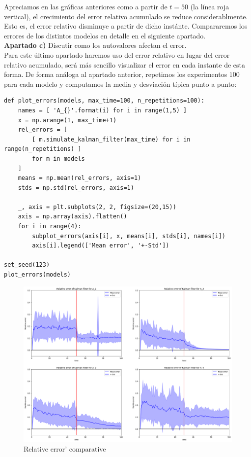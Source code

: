 \documentclass[a4paper]{article}
\begin{document}
Apreciamos en las gráficas anteriores como a partir de $t=50$ (la línea roja vertical), el crecimiento del error relativo acumulado se reduce considerablmente. Esto es, el error relativo disminuye a partir de dicho instánte. Compararemos los errores de los distintos modelos en detalle en el siguiente apartado. \\

\textbf{Apartado c)} Discutir como los autovalores afectan el error. \\

Para este último apartado haremos uso del error relativo en lugar del error relativo acumulado, será más sencillo visualizar el error en cada instante de esta forma. De forma análoga al apartado anterior, repetimos los experimentos $100$ para cada modelo y computamos la media y desviación típica punto a punto:

\begin{verbatim}
def plot_errors(models, max_time=100, n_repetitions=100):
	names = [ 'A_{}'.format(i) for i in range(1,5) ]
	x = np.arange(1, max_time+1)
	rel_errors = [
		[ m.simulate_kalman_filter(max_time) for i in range(n_repetitions) ]
		for m in models
	]
	means = np.mean(rel_errors, axis=1)
	stds = np.std(rel_errors, axis=1)
	
	_, axis = plt.subplots(2, 2, figsize=(20,15))  
	axis = np.array(axis).flatten()
	for i in range(4):
		subplot_errors(axis[i], x, means[i], stds[i], names[i])
		axis[i].legend(['Mean error', '+-Std'])

set_seed(123)
plot_errors(models)
\end{verbatim}

\begin{figure}[H]
	\includegraphics[scale=.6]{figures/kalman1}
	\centering
	\caption{Relative error' comparative}
\end{figure}
\end{document}
